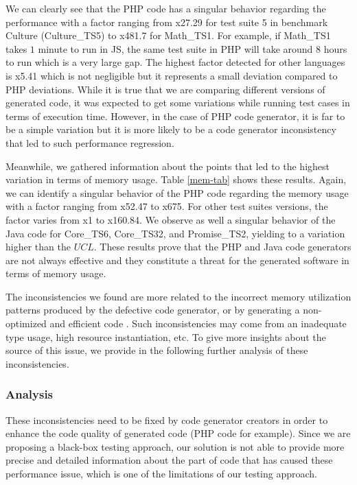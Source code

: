 We can clearly see that the PHP code has a singular behavior regarding the performance with a factor ranging from x27.29 for test suite 5 in benchmark Culture (Culture\_TS5) to x481.7 for Math\_TS1. For example, if Math\_TS1 takes $1$ minute to run in JS, the same test suite in PHP will take around $8$ hours to run which is a very large gap. 
The highest factor detected for other languages is x5.41 which is not negligible but it represents a small deviation compared to PHP deviations. While it is true that we are comparing different versions of generated code, it was expected to get some variations while running test cases in terms of execution time. However, in the case of PHP code generator, it is far to be a simple variation but it is more likely to be a code generator inconsistency that led to such performance regression.


Meanwhile, we gathered information about the points that led to the highest variation in terms of memory usage. Table \ref{mem-tab} shows these results. 
Again, we can identify a singular behavior of the PHP code regarding the memory usage with a factor ranging from x52.47 to x675. For other test suites versions, the factor varies from x1 to x160.84. We observe as well a singular behavior of the Java code for Core\_TS6, Core\_TS32, and Promise\_TS2, yielding to a variation higher than the $UCL$. 
These results prove that the PHP and Java code generators are not always effective and they constitute a threat for the generated software in terms of memory usage.


The inconsistencies we found are more related to the incorrect memory utilization patterns produced by the defective code generator, or by generating a non-optimized and efficient code . Such inconsistencies may come from an inadequate type usage, high resource instantiation, etc.
To give more insights about the source of this issue, we provide in the following further analysis of these inconsistencies.



\subsubsection{Analysis}


These inconsistencies need to be fixed by code generator creators in order to enhance the code quality of generated code (PHP code for example). Since we are proposing a black-box testing approach, our solution is not able to provide more precise and detailed information about the part of code that has caused these performance issue, which is one of the limitations of our testing approach.

